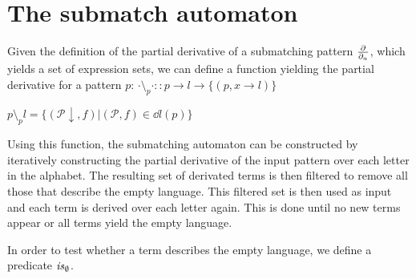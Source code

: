 \section{The submatch automaton}
\label{nfa}

Given the definition of the partial derivative of a submatching pattern
$\frac{\partial}{\partial_{a}}$, which yields a set of expression sets, we can define a function
yielding the partial derivative for a pattern $p$:
$\cdot \setminus_p \cdot :: p \to l \to \{(p, x \to l)\}$

$p \setminus_p l = \{ (\mathcal{P}\downarrow, f) | (\mathcal{P}, f) \in \dd{l}(p) \}$

Using this function, the submatching automaton can be constructed by
iteratively constructing the partial derivative of the input pattern over each
letter in the alphabet. The resulting set of derivated terms is then filtered
to remove all those that describe the empty language. This filtered set is
then used as input and each term is derived over each letter again. This is
done until no new terms appear or all terms yield the empty language.

In order to test whether a term describes the empty language, we define a
predicate $\mathit{is}_\emptyset$.


